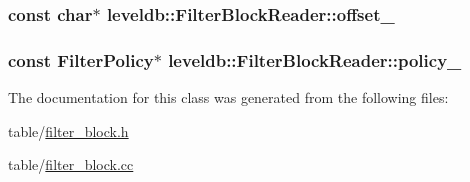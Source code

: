 \hypertarget{classleveldb_1_1_filter_block_reader_a64ae9da0d51b09f6d6c23723f486e0e0}{
\subsubsection[{offset\-\_\-}]{\setlength{\rightskip}{0pt plus 5cm}const char$\ast$ leveldb\-::\-Filter\-Block\-Reader\-::offset\-\_\-\hspace{0.3cm}{\ttfamily [private]}}}\label{classleveldb_1_1_filter_block_reader_a64ae9da0d51b09f6d6c23723f486e0e0}
\hypertarget{classleveldb_1_1_filter_block_reader_a4010e6ad3e0aff23a10260eae3669cdd}{
\subsubsection[{policy\-\_\-}]{\setlength{\rightskip}{0pt plus 5cm}const {\bf Filter\-Policy}$\ast$ leveldb\-::\-Filter\-Block\-Reader\-::policy\-\_\-\hspace{0.3cm}{\ttfamily [private]}}}\label{classleveldb_1_1_filter_block_reader_a4010e6ad3e0aff23a10260eae3669cdd}


The documentation for this class was generated from the following files\-:\begin{DoxyCompactItemize}
\item 
table/\hyperlink{filter__block_8h}{filter\-\_\-block.\-h}\item 
table/\hyperlink{filter__block_8cc}{filter\-\_\-block.\-cc}\end{DoxyCompactItemize}
